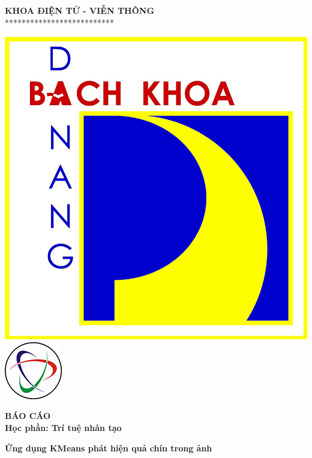 \documentclass[a4paper]{article}
\begin{document}
\begin{titlepage}
\begin{center}
    \vspace{7pt}
    \textbf{KHOA ĐIỆN TỬ - VIỄN THÔNG} \\
    **************************
\end{center}
\vspace{10pt}
\begin{center}
    \includegraphics[scale=0.37]{images/logodut.jpg}
    \includegraphics[scale=0.75]{images/logoete.jpg}
    
    \vspace{20pt}
    \fontsize{20pt}{17pt}\selectfont 
    \textbf{BÁO CÁO} \\
    \vspace{7pt}
    \textbf{Học phần: Trí tuệ nhân tạo}
    \vspace{7pt}

\end{center}
\begin{flushleft}
    \fontsize{15pt}{10pt}\selectfont  
    \textbf{\textsl{}}
\end{flushleft}
\begin{center}
    \hspace{10pt}
    \fontsize{17pt}{17pt}\selectfont 
    \textbf{\textrm{Ứng dụng KMeans phát hiện quả chín trong ảnh}}
\end{center}
\begin{center}
    \fontsize{16pt}{17pt}\selectfont 
    \textbf{\textrm{}}
\end{center}


\end{titlepage}
\end{document}
